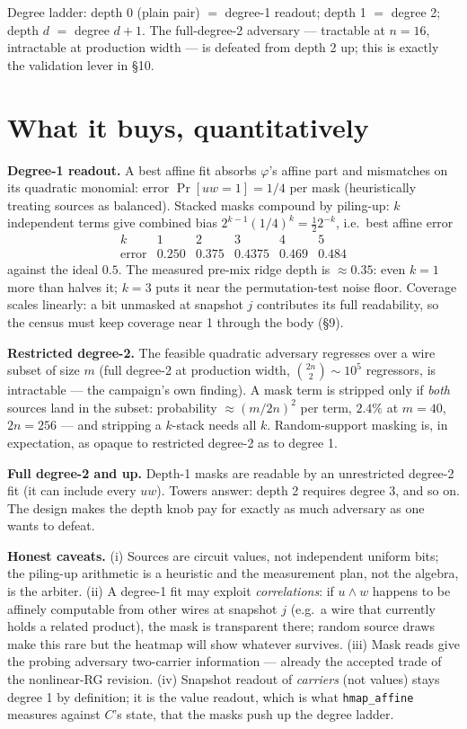 \documentclass[11pt]{article}
\newcommand{\code}[1]{\texttt{#1}}
\begin{document}
Degree ladder: depth 0 (plain pair) $= $ degree-1 readout; depth 1 $=$
degree 2; depth $d$ $=$ degree $d{+}1$. The full-degree-2 adversary ---
tractable at $n{=}16$, intractable at production width --- is defeated
from depth 2 up; this is exactly the validation lever in \S10.

\section{What it buys, quantitatively}\label{sec:buys}

\textbf{Degree-1 readout.} A best affine fit absorbs $\varphi$'s affine
part and mismatches on its quadratic monomial: error $\Pr[uw = 1] = 1/4$
per mask (heuristically treating sources as balanced). Stacked masks
compound by piling-up: $k$ independent terms give combined bias
$2^{k-1}(1/4)^k = \tfrac12 2^{-k}$, i.e.\ best affine error
\[
\renewcommand{\arraystretch}{1.1}
\begin{array}{c|ccccc}
k & 1 & 2 & 3 & 4 & 5 \\
\hline
\text{error} & 0.250 & 0.375 & 0.4375 & 0.469 & 0.484
\end{array}
\]
against the ideal $0.5$. The measured pre-mix ridge depth is
$\approx 0.35$: even $k{=}1$ more than halves it; $k{=}3$ puts it near the
permutation-test noise floor. Coverage scales linearly: a bit unmasked at
snapshot $j$ contributes its full readability, so the census must keep
coverage near 1 through the body (\S9).

\textbf{Restricted degree-2.} The feasible quadratic adversary regresses
over a wire subset of size $m$ (full degree-2 at production width,
$\binom{2n}{2} \sim 10^5$ regressors, is intractable --- the campaign's
own finding). A mask term is stripped only if \emph{both} sources land in
the subset: probability $\approx (m/2n)^2$ per term, $2.4\%$ at $m{=}40$,
$2n{=}256$ --- and stripping a $k$-stack needs all $k$. Random-support
masking is, in expectation, as opaque to restricted degree-2 as to
degree 1.

\textbf{Full degree-2 and up.} Depth-1 masks are readable by an
unrestricted degree-2 fit (it can include every $uw$). Towers answer:
depth 2 requires degree 3, and so on. The design makes the depth knob pay
for exactly as much adversary as one wants to defeat.

\textbf{Honest caveats.} (i) Sources are circuit values, not independent
uniform bits; the piling-up arithmetic is a heuristic and the measurement
plan, not the algebra, is the arbiter. (ii) A degree-1 fit may exploit
\emph{correlations}: if $u \wedge w$ happens to be affinely computable
from other wires at snapshot $j$ (e.g.\ a wire that currently holds a
related product), the mask is transparent there; random source draws make
this rare but the heatmap will show whatever survives. (iii) Mask reads
give the probing adversary two-carrier information --- already the
accepted trade of the nonlinear-RG revision. (iv) Snapshot readout of
\emph{carriers} (not values) stays degree 1 by definition; it is the
value readout, which is what \code{hmap\_affine} measures against $C$'s
state, that the masks push up the degree ladder.
\end{document}
